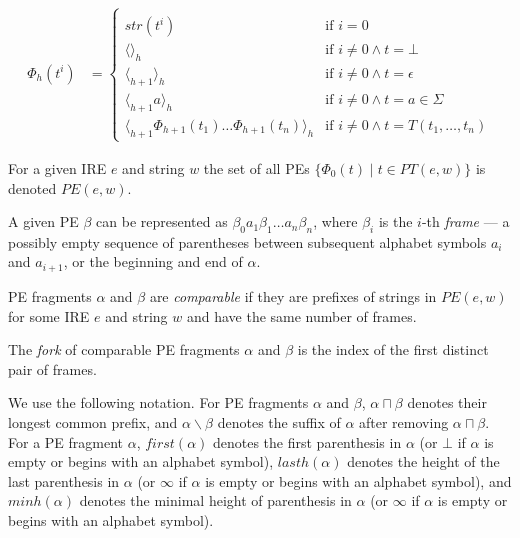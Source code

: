 \documentclass[AMA,STIX1COL]{WileyNJD-v2}
\newcommand{\Xl}{\langle}
\newcommand{\Xr}{\rangle}
\newcommand{\Xm}{\langle\!\rangle}
\newcommand{\PT}{PT}
\newcommand{\PE}{P\!E}
\begin{document}
    \begin{align*}
    \Phi_{h}(t^{i}) &= \begin{cases}
        &\\[-2em]
        str(t^{i})                                            &\text{if } i = 0 \\[-0.2em]
        \Xm_h                                                 &\text{if } i \neq 0 \wedge t = \bot \\[-0.2em]
        \Xl_{h+1} \Xr_h                                       &\text{if } i \neq 0 \wedge t = \epsilon \\[-0.2em]
        \Xl_{h+1} a \Xr_h                                     &\text{if } i \neq 0 \wedge t = a \in \Sigma \\[-0.2em]
        \Xl_{h+1} \Phi_{h+1}(t_1) \dots \Phi_{h+1}(t_n) \Xr_h &\text{if } i \neq 0 \wedge t = T(t_1, \dots, t_n)
    \end{cases}
    \end{align*}

For a given IRE $e$ and string $w$ the set of all PEs $\big\{ \Phi_{0}(t) \mid t \in \PT(e, w) \big\}$ is denoted $\PE(e, w)$.

    \begin{definition}
    \label{def_pe_frames}
    A given PE $\beta$ can be represented as $\beta_0 a_1 \beta_1 \dots a_n \beta_n$,
    where $\beta_i$ is the $i$-th \emph{frame} --- a possibly empty sequence of parentheses between
    subsequent alphabet symbols $a_i$ and $a_{i+1}$, or the beginning and end of $\alpha$.
    \end{definition}

    \begin{definition}
    \label{def_pe_comparability}
    PE fragments $\alpha$ and $\beta$ are \emph{comparable}
    if they are prefixes of strings in $\PE(e, w)$ for some IRE $e$ and string $w$
    and have the same number of frames.
    \end{definition}

    \begin{definition}[Fork]
    The \emph{fork} of comparable PE fragments $\alpha$ and $\beta$ is the index of the first distinct pair of frames.
    \end{definition}

We use the following notation. For PE fragments $\alpha$ and $\beta$,
$\alpha \sqcap \beta$ denotes their longest common prefix,
and $\alpha \backslash \beta$ denotes the suffix of $\alpha$ after removing $\alpha \sqcap \beta$.
For a PE fragment $\alpha$,
$f\!irst(\alpha)$ denotes the first parenthesis in $\alpha$ (or $\bot$ if $\alpha$ is empty or begins with an alphabet symbol),
$lasth(\alpha)$ denotes the height of the last parenthesis in $\alpha$ (or $\infty$ if $\alpha$ is empty or begins with an alphabet symbol),
and $minh(\alpha)$ denotes the minimal height of parenthesis in $\alpha$ (or $\infty$ if $\alpha$ is empty or begins with an alphabet symbol).
\end{document}
